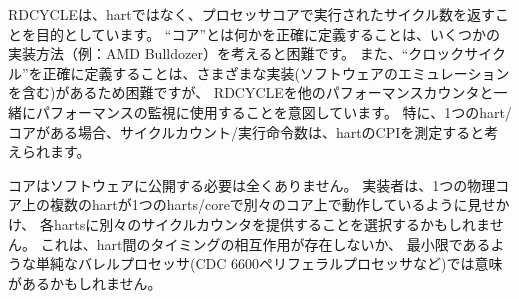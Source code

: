 \begin{commentary}
\begin{comment}
RDCYCLE is intended to return the number of cycles executed by the
processor core, not the hart.  Precisely defining what is a ``core'' is
difficult given some implementation choices (e.g., AMD Bulldozer).
Precisely defining what is a ``clock cycle'' is also difficult given the
range of implementations (including software emulations), but the
intent is that RDCYCLE is used for performance monitoring along with the
other performance counters.  In particular, where there is one
hart/core, one would expect cycle-count/instructions-retired to
measure CPI for a hart.
\end{comment}

RDCYCLEは、hartではなく、プロセッサコアで実行されたサイクル数を返すことを目的としています。
``コア''とは何かを正確に定義することは、いくつかの実装方法（例：AMD Bulldozer）を考えると困難です。
また、``クロックサイクル''を正確に定義することは、さまざまな実装(ソフトウェアのエミュレーションを含む)があるため困難ですが、
RDCYCLEを他のパフォーマンスカウンタと一緒にパフォーマンスの監視に使用することを意図しています。
特に、1つのhart/コアがある場合、サイクルカウント/実行命令数は、hartのCPIを測定すると考えられます。

\begin{comment}
Cores don't have to be exposed to software at all, and an implementor
might choose to pretend multiple harts on one physical core are
running on separate cores with one hart/core, and provide separate
cycle counters for each hart.  This might make sense in a simple
barrel processor (e.g., CDC 6600 peripheral processors) where
inter-hart timing interactions are non-existent or minimal.
\end{comment}

コアはソフトウェアに公開する必要は全くありません。
実装者は、1つの物理コア上の複数のhartが1つのharts/coreで別々のコア上で動作しているように見せかけ、
各hartsに別々のサイクルカウンタを提供することを選択するかもしれません。
これは、hart間のタイミングの相互作用が存在しないか、
最小限であるような単純なバレルプロセッサ(CDC 6600ペリフェラルプロセッサなど)では意味があるかもしれません。


\end{commentary}
